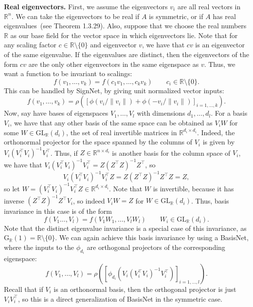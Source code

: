 \documentclass{article} \usepackage{iclr2023_conference,times}
\newcommand{\RR}{\mathbb R}
\newcommand{\mrm}[1]{\mathrm{#1}}
\newcommand\norm[1]{\lVert#1\rVert}
\begin{document}
\textbf{Real eigenvectors.} First, we assume the eigenvectors $v_i$ are all real vectors in $\RR^n$. We can take the eigenvectors to be real if $A$ is symmetric, or if $A$ has real eigenvalues~(see \cite{horn2012matrix} Theorem 1.3.29). Also, suppose that we choose the real numbers $\RR$ as our base field for the vector space in which eigenvectors lie. Note that for any scaling factor $c \in \RR \setminus \{0\}$ and eigenvector $v$, we have that $cv$ is an eigenvector of the same eigenvalue. If the eigenvalues are distinct, then the eigenvectors of the form $cv$ are the only other eigenvectors in the same eigenspace as $v$. Thus, we want a function to be invariant to scalings:
\begin{equation}
    f(v_1, \ldots, v_k) = f(c_1 v_1, \ldots, c_k v_k) \qquad c_i \in \RR \setminus \{0\}.
\end{equation}
This can be handled by SignNet, by giving unit normalized vector inputs:
\begin{equation}
    f(v_1, \ldots, v_k) = \rho\left(\left[\phi(v_i/ \norm{v_i}) + \phi(-v_i/\norm{v_i}) \right]_{i=1, \ldots, k} \right).
\end{equation}
Now, say have bases of eigenspaces $V_1, \ldots, V_l$ with dimensions $d_1, \ldots, d_l$. For a basis $V_i$, we have that any other basis of the same space can be obtained as $V_i W$ for some $W \in \mrm{GL}_\RR(d_i)$, the set of real invertible matrices in $\RR^{d_i \times d_i}$. Indeed, the orthonormal projector for the space spanned by the columns of $V_i$ is given by $V_i(V_i^\top V_i)^{-1}V_i^\top$. Thus, if $Z \in \RR^{n \times d_i}$ is another basis for the column space of $V_i$, we have that $V_i(V_i^\top V_i)^{-1}V_i^\top = Z(Z^\top Z)^{-1}Z^\top$, so 
\begin{equation}
    V_i(V_i^\top V_i)^{-1} V_i^\top Z = Z (Z^\top Z)^{-1} Z^\top Z = Z,
\end{equation}
so let $W = (V_i^\top V_i)^{-1}V_i^\top Z \in \RR^{d_i \times d_i}$. Note that $W$ is invertible, because it has inverse $(Z^\top Z)^{-1}Z^\top V_i$, so indeed $V_i W = Z$ for $W \in \mrm{GL}_\RR(d_i)$. Thus, basis invariance in this case is of the form
\begin{equation}
    f(V_1 \ldots, V_l ) = f(V_1 W_1, \ldots, V_l W_l) \qquad W_i \in \mrm{GL}_\RR(d_i).
\end{equation}
Note that the distinct eigenvalue invariance is a special case of this invariance, as $\mrm{G}_{\RR}(1) = \RR \setminus \{0\}$.
We can again achieve this basis invariance by using a BasisNet, where the inputs to the $\phi_{d_i}$ are orthogonal projectors of the corresponding eigenspace:
\begin{equation}
    f(V_1, \ldots, V_l) = \rho\left(\left[\phi_{d_i}(V_i (V_i^\top V_i)^{-1} V_i^\top) \right]_{i=1, \ldots, l} \right).
\end{equation}
Recall that if $V_i$ is an orthonormal basis, then the orthogonal projector is just $V_i V_i^\top$, so this is a direct generalization of BasisNet in the symmetric case.
\end{document}
